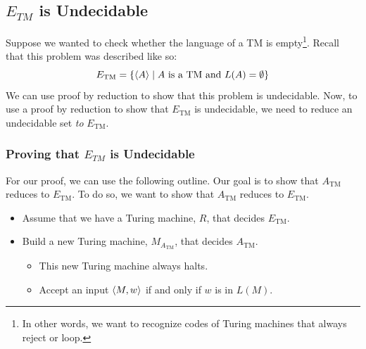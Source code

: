 \documentclass[letterpaper]{article}
\begin{document}
\subsection{\texorpdfstring{$E_{TM}$}{ETM} is Undecidable}
Suppose we wanted to check whether the language of a TM is empty\footnote{In other words, we want to recognize codes of Turing machines that always reject or loop.}. Recall that this problem was described like so:  
\[E_{\text{TM}} = \{\langle A \rangle \mid A \text{ is a TM and } L(A) = \emptyset\}\]
We can use proof by reduction to show that this problem is undecidable. Now, to use a proof by reduction to show that $E_{\text{TM}}$ is undecidable, we need to reduce an undecidable set \emph{to} $E_{\text{TM}}$. 

\subsubsection{Proving that \texorpdfstring{$E_{TM}$}{ETM} is Undecidable}
For our proof, we can use the following outline. Our goal is to show that $A_{\text{TM}}$ reduces to $E_{\text{TM}}$. To do so, we want to show that $A_{\text{TM}}$ reduces to $E_{\text{TM}}$. 
\begin{itemize}
    \item Assume that we have a Turing machine, $R$, that decides $E_{\text{TM}}$. 
    \item Build a new Turing machine, $M_{A_{\text{TM}}}$, that decides $A_{\text{TM}}$. 
    \begin{itemize}
        \item This new Turing machine always halts.
        \item Accept an input $\langle M, w \rangle$ if and only if $w$ is in $L(M)$. 
    \end{itemize}
\end{itemize}
\end{document}
